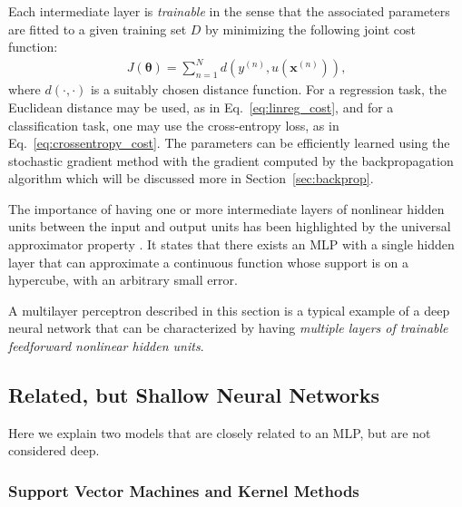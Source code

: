 \documentclass[dissertation,nocontribution]{aaltoseries}
\newcommand{\vect}[1]{\mathbf{#1}}
\newcommand{\vects}[1]{\boldsymbol{#1}}
\newcommand{\vx}[0]{\vect{x}}
\newcommand{\TT}[0]{{\vects{\theta}}}
\begin{document}
Each intermediate layer is \textit{trainable} in the sense
that the associated parameters are fitted to a given
training set $D$ by minimizing the following joint cost
function:
\begin{align}
    \label{eq:mlp_cost}
    J(\TT) = \sum_{n=1}^N d\left(y^{(n)}, u(\vx^{(n)})\right),
\end{align}
where $d(\cdot, \cdot)$ is a suitably chosen distance
function. For a regression task, the Euclidean distance may be
used, as in Eq.~\eqref{eq:linreg_cost}, and for a
classification task, one may use the cross-entropy loss, as in
Eq.~\eqref{eq:crossentropy_cost}. The parameters can be
efficiently learned using the stochastic gradient method with the
gradient computed by the backpropagation algorithm
\citep{Rumelhart1986} which will be discussed more in
Section~\ref{sec:backprop}.

The importance of having one or more intermediate layers of
nonlinear hidden units between the input and output units has
been highlighted by the universal approximator property
\citep{Cybenko1989,Hornik1989}. It 
states that there exists an MLP with a single hidden layer that
can approximate a continuous function whose support is on a
hypercube, with an arbitrary small error.


A multilayer perceptron described in this section is a typical
example of a deep neural network that can be characterized by
having \textit{multiple layers of trainable feedforward nonlinear
hidden units}. 

\subsection{Related, but Shallow Neural Networks}

Here we explain two models that are closely related to an MLP,
but are not considered deep.

\subsubsection{Support Vector Machines and Kernel Methods}
\label{sec:svm}
\end{document}
